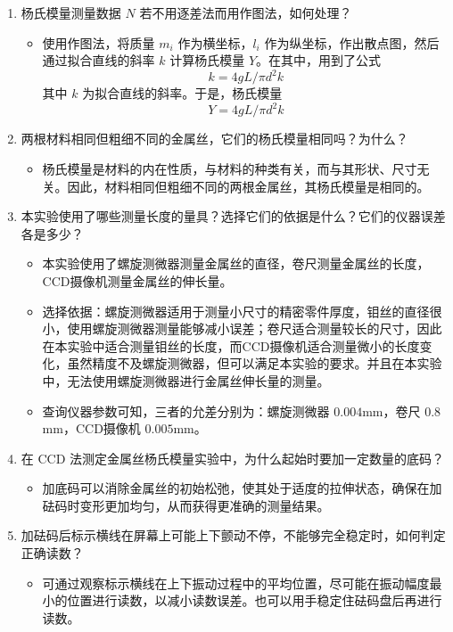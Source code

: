 \documentclass[zihao=5, UTF8]{article}
\theoremstyle{MyLineTheoremStyle} %
\theoremstyle{MyBlockTheoremStyle} %
\theoremstyle{MySubsubsectionStyle} %
\begin{document}
\begin{enumerate}
    \item 杨氏模量测量数据 $N$ 若不用逐差法而用作图法，如何处理？
    \begin{itemize}
      \item 使用作图法，将质量 $m_i$ 作为横坐标，$l_i$ 作为纵坐标，作出散点图，然后通过拟合直线的斜率 $k$ 计算杨氏模量 $Y$。在其中，用到了公式\[k = 4gL/\pi d^2 k\]其中 $k$ 为拟合直线的斜率。于是，杨氏模量 \[Y = 4gL/\pi d^2 k\]
    \end{itemize}
    
    \item 两根材料相同但粗细不同的金属丝，它们的杨氏模量相同吗？为什么？
    \begin{itemize}
        \item 杨氏模量是材料的内在性质，与材料的种类有关，而与其形状、尺寸无关。因此，材料相同但粗细不同的两根金属丝，其杨氏模量是相同的。
    \end{itemize}
    
    \item 本实验使用了哪些测量长度的量具？选择它们的依据是什么？它们的仪器误差各是多少？
    \begin{itemize}
        \item 本实验使用了螺旋测微器测量金属丝的直径，卷尺测量金属丝的长度，CCD摄像机测量金属丝的伸长量。
        \item 选择依据：螺旋测微器适用于测量小尺寸的精密零件厚度，钼丝的直径很小，使用螺旋测微器测量能够减小误差；卷尺适合测量较长的尺寸，因此在本实验中适合测量钼丝的长度，而CCD摄像机适合测量微小的长度变化，虽然精度不及螺旋测微器，但可以满足本实验的要求。并且在本实验中，无法使用螺旋测微器进行金属丝伸长量的测量。
        \item 查询仪器参数可知，三者的允差分别为：螺旋测微器 $0.004$mm，卷尺 $0.8$mm，CCD摄像机 $0.005$mm。
    \end{itemize}
    
    \item 在 CCD 法测定金属丝杨氏模量实验中，为什么起始时要加一定数量的底码？
    \begin{itemize}
        \item 加底码可以消除金属丝的初始松弛，使其处于适度的拉伸状态，确保在加砝码时变形更加均匀，从而获得更准确的测量结果。
    \end{itemize}
    
    \item 加砝码后标示横线在屏幕上可能上下颤动不停，不能够完全稳定时，如何判定正确读数？
    \begin{itemize}
        \item 可通过观察标示横线在上下振动过程中的平均位置，尽可能在振动幅度最小的位置进行读数，以减小读数误差。也可以用手稳定住砝码盘后再进行读数。
    \end{itemize}
    

\end{enumerate}
\end{document}
